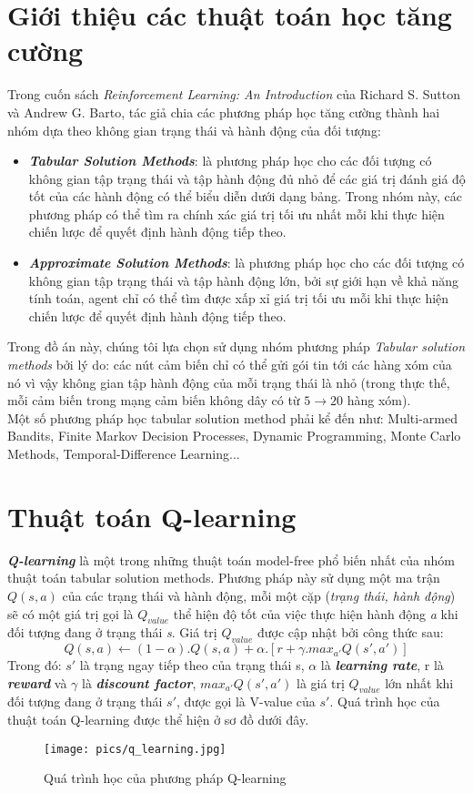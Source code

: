 \documentclass[12pt]{report}
\begin{document}
\section{Giới thiệu các thuật toán học tăng cường}
\label{sec:3.2}
Trong cuốn sách \textit{Reinforcement Learning: An Introduction} của Richard S. Sutton và Andrew G. Barto, tác giả chia các phương pháp học tăng cường thành hai nhóm dựa theo không gian trạng thái và hành động của đối tượng:
\begin{itemize}
\item \textbf{\textit{Tabular Solution Methods}}: là phương pháp học cho các đối tượng có không gian tập trạng thái và tập hành động đủ nhỏ để các giá trị đánh giá độ tốt của các hành động có thể biểu diễn dưới dạng bảng. Trong nhóm này, các phương pháp có thể tìm ra chính xác giá trị tối ưu nhất mỗi khi thực hiện chiến lược để quyết định hành động tiếp theo.
\item \textbf{\textit{Approximate Solution Methods}}: là phương pháp học cho các đối tượng có không gian tập trạng thái và tập hành động lớn, bởi sự giới hạn về khả năng tính toán, agent chỉ có thể tìm được xấp xỉ giá trị tối ưu mỗi khi thực hiện chiến lược để quyết định hành động tiếp theo.
\end{itemize}
Trong đồ án này, chúng tôi lựa chọn sử dụng nhóm phương pháp \textit{Tabular solution methods} bởi lý do: các nút cảm biến chỉ có thể gửi gói tin tới các hàng xóm của nó vì vậy không gian tập hành động của mỗi trạng thái là nhỏ (trong thực thế, mỗi cảm biến trong mạng cảm biến không dây có từ $5 \rightarrow 20$ hàng xóm). \\
Một số phương pháp học tabular solution method phải kể đến như: Multi-armed Bandits, Finite Markov Decision Processes, Dynamic Programming, Monte Carlo Methods, Temporal-Difference Learning... 
\section{Thuật toán Q-learning}
\label{sec:3.3}
\textit{\textbf{Q-learning}} là một trong những thuật toán model-free phổ biến nhất của nhóm thuật toán tabular solution methods. Phương pháp này sử dụng một ma trận $Q(s, a)$ của các trạng thái và hành động, mỗi một cặp (\textit{trạng thái, hành động}) sẽ có một giá trị gọi là $Q_{value}$ thể hiện độ tốt của việc thực hiện hành động \textit{a} khi đối tượng đang ở trạng thái \textit{s}. Giá trị $Q_{value}$ được cập nhật bởi công thức sau:
\begin{equation}
Q(s,a) \leftarrow (1 - \alpha). Q(s,a) + \alpha . [r + \gamma . max_{a'}Q(s', a')]
\end{equation}  
Trong đó: $s'$ là trạng ngay tiếp theo của trạng thái s, $\alpha$ là \textit{\textbf{learning rate}}, r là \textbf{\textit{reward}} và $\gamma$ là \textbf{\textit{discount factor}}, $max_{a'}Q(s', a')$ là giá trị $Q_{value}$ lớn nhất khi đối tượng đang ở trạng thái $s'$, được gọi là V-value của $s'$. Quá trình học của thuật toán Q-learning được thể hiện ở sơ đồ dưới đây.
\begin{figure}[H]
\centering 
\texttt{[image: pics/q\_learning.jpg]}
\caption{Quá trình học của phương pháp Q-learning}
\end{figure}
\end{document}
